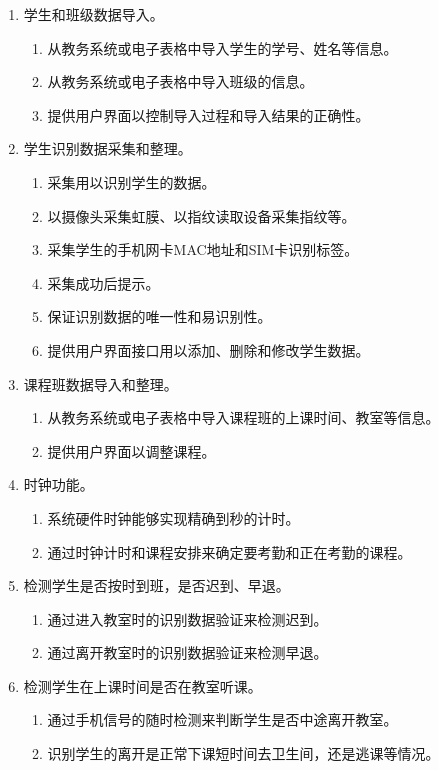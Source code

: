 \documentclass[cs4size,a4paper,nofonts]{ctexart}
\begin{document}
\begin{enumerate}
\item 学生和班级数据导入。
\begin{enumerate}
\item 从教务系统或电子表格中导入学生的学号、姓名等信息。
\item 从教务系统或电子表格中导入班级的信息。
\item 提供用户界面以控制导入过程和导入结果的正确性。
\end{enumerate}
\item 学生识别数据采集和整理。
\begin{enumerate}
\item 采集用以识别学生的数据。
\item 以摄像头采集虹膜、以指纹读取设备采集指纹等。
\item 采集学生的手机网卡MAC地址和SIM卡识别标签。
\item 采集成功后提示。
\item 保证识别数据的唯一性和易识别性。
\item 提供用户界面接口用以添加、删除和修改学生数据。
\end{enumerate}
\item 课程班数据导入和整理。
\begin{enumerate}
\item 从教务系统或电子表格中导入课程班的上课时间、教室等信息。
\item 提供用户界面以调整课程。
\end{enumerate}
\item 时钟功能。
\begin{enumerate}
\item 系统硬件时钟能够实现精确到秒的计时。
\item 通过时钟计时和课程安排来确定要考勤和正在考勤的课程。
\end{enumerate}
\item 检测学生是否按时到班，是否迟到、早退。
\begin{enumerate}
\item 通过进入教室时的识别数据验证来检测迟到。
\item 通过离开教室时的识别数据验证来检测早退。
\end{enumerate}
\item 检测学生在上课时间是否在教室听课。
\begin{enumerate}
\item 通过手机信号的随时检测来判断学生是否中途离开教室。
\item 识别学生的离开是正常下课短时间去卫生间，还是逃课等情况。

\end{enumerate}
\end{enumerate}
\end{document}
